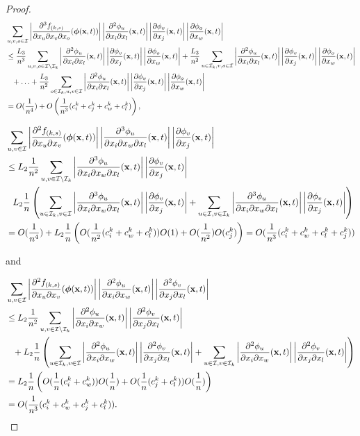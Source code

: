 \documentclass[acmsmall]{acmart}
\newcommand\bx{\mathbf{x}}
\newcommand\bphi{\text{\boldmath$\phi$}}
\newcommand\calI{\mathcal{I}}
\newcommand\abs[1]{\left|#1\right|}         %
\newcommand{\ddd}[4]{ \frac{\partial^3 #1 }{ \partial x_{#2} \partial x_{#3} \partial x_{#4} }}
\newcommand{\dd}[3]{ \frac{\partial^2 #1 }{ \partial x_{#2} \partial x_{#3}}}
\begin{document}
\begin{proof}
\begin{align*}
& \sum_{u,v,o \in \calI}\abs{ \ddd{f_{(k,s)}}{u}{v}{o}(\bphi (\bx,t))} \abs{\dd{\phi_{u}}{i}{l}(\bx,t)} \abs{\frac{\partial \phi_{v}}{\partial x_j}(\bx,t)} \abs{\frac{\partial \phi_{o}}{\partial x_w}(\bx,t)} \\
& \leq \frac{L_3}{n^3} \sum_{u,v,o \in \calI \setminus \calI_k} \abs{\dd{\phi_{u}}{i}{l}(\bx,t)} \abs{\frac{\partial \phi_{v}}{\partial x_j}(\bx,t)} \abs{\frac{\partial \phi_{o}}{\partial x_w}(\bx,t)} + \frac{L_3}{n^2} \sum_{u \in \calI_k, v,o \in \calI} \abs{\dd{\phi_{u}}{i}{l}(\bx,t)} \abs{\frac{\partial \phi_{v}}{\partial x_j}(\bx,t)} \abs{\frac{\partial \phi_{o}}{\partial x_w}(\bx,t)} \\
& \phantom{\leq} + \hdots + \frac{L_3}{n^2} \sum_{o \in \calI_k, u,v \in \calI} \abs{\dd{\phi_{u}}{i}{l}(\bx,t)} \abs{\frac{\partial \phi_{v}}{\partial x_j}(\bx,t)} \abs{\frac{\partial \phi_{o}}{\partial x_w}(\bx,t)} \\
& = O(\frac{1}{n^4}) + O\left(\frac{1}{n^3}(c^k_i + c^k_j + c^k_w + c^k_l)\right),
\end{align*}

\begin{align*}
& \sum_{u,v \in \calI} \abs{\dd{f_{(k,s)}}{u}{v}(\bphi (\bx,t))} \abs{\ddd{\phi_{u}}{i}{w}{l}(\bx,t)} \abs{\frac{\partial \phi_{v}}{\partial x_j}(\bx,t)} \\
& \leq L_{2}\frac{1}{n^2}\sum_{u, v \in \calI \setminus \calI_k} \abs{\ddd{\phi_{u}}{i}{w}{l}(\bx,t)}\abs{\frac{\partial \phi_{v}}{\partial x_j}(\bx,t)} \\
& \phantom{\leq} L_{2}\frac{1}{n}\left(\sum_{u \in \calI_k,v\in \calI} \abs{\ddd{\phi_{u}}{i}{w}{l}(\bx,t)} \abs{\frac{\partial \phi_{v}}{\partial x_j}(\bx,t)} + \sum_{u \in \calI,v\in \calI_k} \abs{\ddd{\phi_{u}}{i}{w}{l}(\bx,t)} \abs{\frac{\partial \phi_{v}}{\partial x_j}(\bx,t)}\right) \\
& = O(\frac{1}{n^4}) + L_{2}\frac{1}{n}\left( O(\frac{1}{n^2}(c^k_{i} + c^k_{w} + c^k_{l}))O(1) + O(\frac{1}{n^2})O(c^k_{j}) \right) = O(\frac{1}{n^3}(c^k_{i} + c^k_{w} + c^k_{l} + c^k_{j}))
\end{align*}

and

\begin{align*}
& \sum_{u,v \in \calI} \abs{\dd{f_{(k,s)}}{u}{v}(\bphi (\bx,t))} \abs{\dd{\phi_{u}}{i}{w}(\bx,t)} \abs{\dd{\phi_{v}}{j}{l}(\bx,t)} \\
& \leq L_{2}\frac{1}{n^2}\sum_{u, v\in \calI \setminus \calI_k} \abs{\dd{\phi_{u}}{i}{w}(\bx,t)} \abs{\dd{\phi_{v}}{j}{l}(\bx,t)} \\
& \phantom{\leq}+ L_{2}\frac{1}{n}\left( \sum_{u \in \calI_k,v\in \calI} \abs{\dd{\phi_{u}}{i}{w}(\bx,t)} \abs{\dd{\phi_{v}}{j}{l}(\bx,t)} + \sum_{u \in \calI,v\in \calI_k} \abs{\dd{\phi_{u}}{i}{w}(\bx,t)} \abs{\dd{\phi_{v}}{j}{l}(\bx,t)} \right) \\
& = L_{2}\frac{1}{n}\left( O(\frac{1}{n}(c^k_{i} + c^k_{w}) )O(\frac{1}{n}) + O(\frac{1}{n}(c^k_{j} + c^k_{l}) )O(\frac{1}{n})  \right) \\
& = O(\frac{1}{n^3}(c^k_{i} + c^k_{w} + c^k_{j} + c^k_{l})).
\end{align*}


\end{proof}
\end{document}
